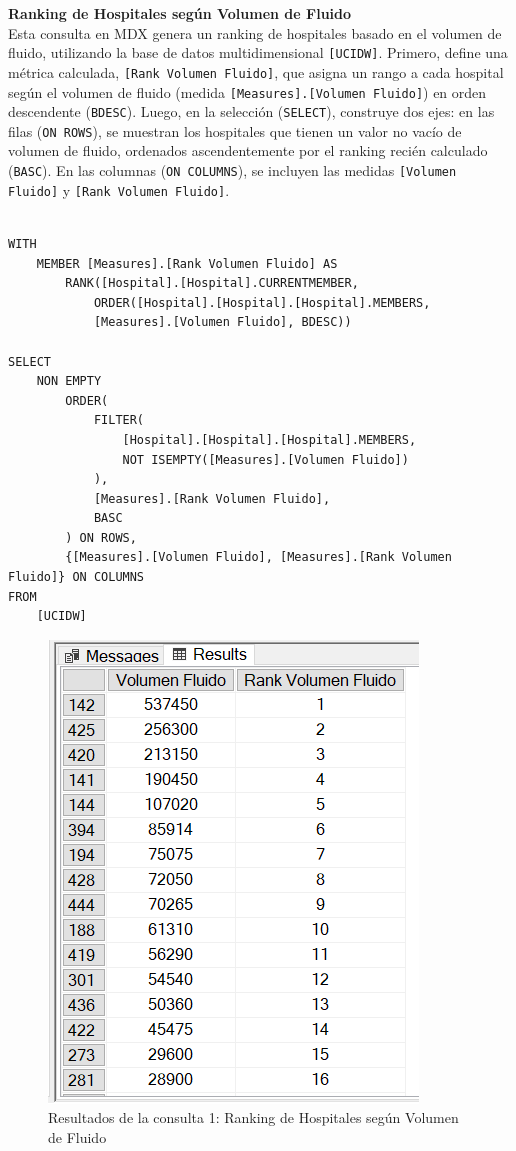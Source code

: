 \documentclass{article}
\begin{document}
\textbf{Ranking de Hospitales según Volumen de Fluido}
\\

Esta consulta en MDX genera un ranking de hospitales basado en el volumen de fluido, utilizando la base de datos multidimensional \texttt{[UCIDW]}. Primero, define una métrica calculada, \texttt{[Rank Volumen Fluido]}, que asigna un rango a cada hospital según el volumen de fluido (medida \texttt{[Measures].[Volumen Fluido]}) en orden descendente (\texttt{BDESC}). Luego, en la selección (\texttt{SELECT}), construye dos ejes: en las filas (\texttt{ON ROWS}), se muestran los hospitales que tienen un valor no vacío de volumen de fluido, ordenados ascendentemente por el ranking recién calculado (\texttt{BASC}). En las columnas (\texttt{ON COLUMNS}), se incluyen las medidas \texttt{[Volumen Fluido]} y \texttt{[Rank Volumen Fluido]}. 
\\
	
\begin{lstlisting}[style=ddlstyle, label=lst:consulta1,caption=Consulta 1: Ranking de Hospitales según Volumen de Fluido]

WITH 
	MEMBER [Measures].[Rank Volumen Fluido] AS 
		RANK([Hospital].[Hospital].CURRENTMEMBER, 
			ORDER([Hospital].[Hospital].[Hospital].MEMBERS, 
			[Measures].[Volumen Fluido], BDESC))

SELECT 
	NON EMPTY 
		ORDER(
			FILTER(
				[Hospital].[Hospital].[Hospital].MEMBERS,
				NOT ISEMPTY([Measures].[Volumen Fluido])
			),
			[Measures].[Rank Volumen Fluido],
			BASC
		) ON ROWS, 
		{[Measures].[Volumen Fluido], [Measures].[Rank Volumen Fluido]} ON COLUMNS
FROM 
	[UCIDW]
\end{lstlisting}

\begin{figure}[H]
	\centering
	\includegraphics[width=0.4\linewidth]{images/consulta1.png}
	\caption{Resultados de la consulta 1: Ranking de Hospitales según Volumen de Fluido}
	\label{fig:consulta1}
\end{figure}
\end{document}
